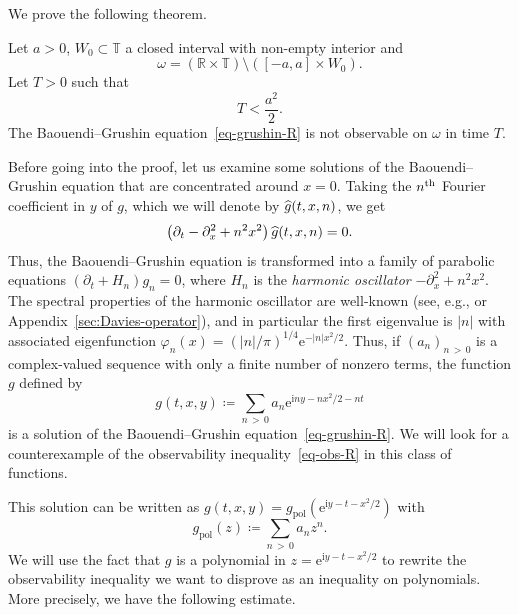 \documentclass[AHL,Unicode,longabstracts,published]{cedram}
\newcommand{\1}{\mathds 1}
\newcommand{\R}{\mathbb{R}}
\newcommand{\T}{\mathbb{T}}
\newcommand{\eu}{\mathrm e}
\newcommand{\iu}{\mathrm i}
\newcommand{\pol}{{\mathrm{pol}}}
\newcommand{\f}{\varphi}
\renewcommand{\o}{\omega}
\let\oldhat\hat
\renewcommand*{\hat}[1]{\mathchoice{\widehat{#1}}{\widehat{#1}}{\oldhat{#1}}{\oldhat{#1}}}
\renewcommand{\o}{\omega}
\begin{document}
We prove the following theorem.

\begin{theo}\label{th-model-neg}
Let $a>0$, $W_0\subset \T$ a closed interval with non-empty interior and
\begin{equation}\label{eq-def-o-model}
\o = (\R\times \T)\setminus([-a,a]\times W_0).
\end{equation}
Let $T>0$ such that
\[
T < \frac{a^2}2.
\]
The Baouendi--Grushin equation~\eqref{eq-grushin-R} is not observable on $\o$ in time $T$.
\end{theo}

Before going into the proof, let us examine some solutions of the Baouendi--Grushin equation that are concentrated around $x=0$. Taking the $n^{\rm th}$ Fourier coefficient in $y$ of $g$, which we will denote by $\hat g(t,x,n)$, we get
\begin{equation}\label{eq-grushin-R-fourier}
\left(\partial_t -\partial_x^2 +n^2x^2\right)\hat g(t,x,n) = 0.
\end{equation}
Thus, the Baouendi--Grushin equation is transformed into a family of parabolic equations $(\partial_t + H_n)g_n = 0$, where $H_n$ is the \emph{harmonic oscillator} $-\partial_x^2 + n^2 x^2$. The spectral properties of the harmonic oscillator are well-known (see, e.g., \cite[\S~1.3]{Helffer13} or Appendix~\ref{sec:Davies-operator}), and in particular the first eigenvalue is $|n|$ with associated eigenfunction $\f_n(x) = (|n|/\pi)^{1/4} \eu^{-|n|x^2\!/2}$. Thus, if $(a_n)_{n\,>\,0}$ is a complex-valued sequence with only a finite number of nonzero terms, the function $g$ defined by
\begin{equation}\label{eq-model-solution}
g(t,x,y) \coloneqq \sum_{n\,>\,0} a_n \eu^{\iu n y - n x^2\!/2 - nt}
\end{equation}
is a solution of the Baouendi--Grushin equation~\eqref{eq-grushin-R}. We will look for a counterexample of the observability inequality~\eqref{eq-obs-R} in this class of functions.

This solution can be written as $g(t,x,y) = g_\pol(\eu^{\iu y - t -x^2\!/2})$ with
\begin{equation}\label{eq-model-polyn}
g_\pol(z) \coloneqq \sum_{n\,>\,0} a_n z^n.
\end{equation}
We will use the fact that $g$ is a polynomial in $z = \eu^{\iu y - t -x^2\!/2}$ to rewrite the observability inequality we want to disprove as an inequality on polynomials. More precisely, we have the following estimate.
\end{document}
